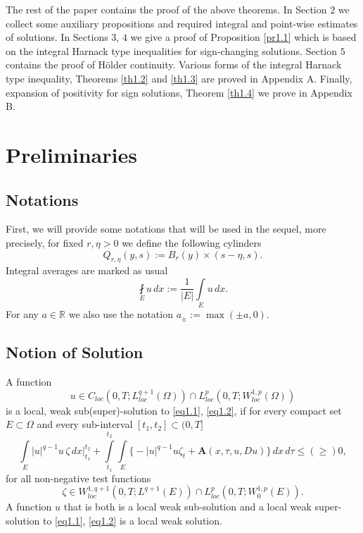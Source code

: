 \documentclass[a4paper,11pt,fullpage]{article}
\numberwithin{equation}{section}
\begin{document}
 The rest of the paper contains the proof of the above theorems. In Section $2$ we collect some auxiliary
 propositions and required integral and point-wise estimates of solutions.  In Sections $3$, $4$ we give a proof of Proposition \ref{pr1.1}
 which is based on the integral Harnack type inequalities for sign-changing solutions. Section $5$ contains the proof of H\"{o}lder continuity. Various forms of the integral  Harnack type inequality, Theorems \ref{th1.2} and \ref{th1.3} are proved in Appendix A.
Finally, expansion of positivity for sign solutions, Theorem \ref{th1.4} we prove in Appendix B. 
 
 
\section{ Preliminaries}

\subsection{Notations}
First, we will provide some notations that will be used in the sequel, more precisely,
for fixed $r, \eta >0$ we define the following  cylinders 
$$Q_{r, \eta}(y, s):=B_r(y)\times (s-\eta, s).$$
Integral averages are marked as usual
$$\fint\limits_E u\,dx:=\frac{1}{|E|}\int\limits_E u\,dx.$$
For any $a \in \mathbb{R}$  we also use the notation $a_{\pm}:= \max(\pm a, 0)$.  

\subsection{Notion of Solution}

A function
\begin{equation*}
u\in C_{loc}(0, T; L^{q+1}_{loc}(\Omega))\cap L^p_{loc}(0, T; W^{1, p}_{loc}(\Omega))
\end{equation*}
 is a local, weak sub(super)-solution to \eqref{eq1.1}, \eqref{eq1.2}, if for every
 compact set $E\subset \Omega$ and every sub-interval $[t_1,  t_2] \subset (0, T]$
\begin{equation}\label{eq2.1}
\int\limits_{E}|u|^{q-1} u\,\zeta\,dx\Big|^{t_2}_{t_1}+\int\limits_{t_1}^{t_2}\int\limits_E\big\{-|u|^{q-1} u \zeta_t+ \mathbf{A}(x, \tau, u, D u)\big\}\,dx\,d\tau \leqslant (\geqslant ) 0,
\end{equation}
 for all non-negative test functions
 $$\zeta \in W^{1, q+1}_{loc}(0, T; L^{q+1}(E))\cap L^p_{loc}(0, T; W^{1, p}_0(E)).$$
A function $u$  that is both is a local weak sub-solution and a local weak super-solution to \eqref{eq1.1}, \eqref{eq1.2} is  a local weak solution.
\end{document}
